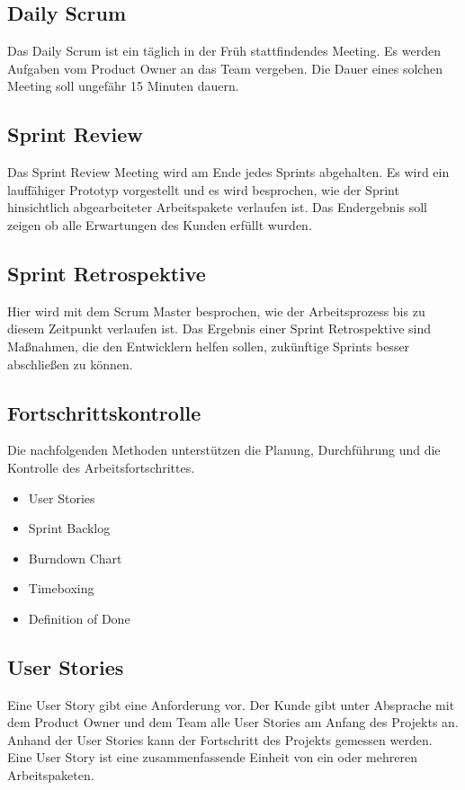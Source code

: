 		\subsection{Daily Scrum}
		Das Daily Scrum ist ein täglich in der Früh stattfindendes Meeting. Es werden Aufgaben vom Product Owner an das Team vergeben. Die Dauer eines solchen Meeting soll ungefähr 15 Minuten dauern.
		\subsection{Sprint Review}
		Das Sprint Review Meeting wird am Ende jedes Sprints abgehalten. Es wird ein lauffähiger Prototyp vorgestellt und es wird besprochen, wie der Sprint hinsichtlich abgearbeiteter Arbeitspakete verlaufen ist. Das Endergebnis soll zeigen ob alle Erwartungen des Kunden erfüllt wurden.
		\subsection{Sprint Retrospektive}
		Hier wird mit dem Scrum Master besprochen, wie der Arbeitsprozess bis zu diesem Zeitpunkt verlaufen ist. Das Ergebnis einer Sprint Retrospektive sind Maßnahmen, die den Entwicklern helfen sollen, zukünftige Sprints besser abschließen zu können.
		\subsection{Fortschrittskontrolle}
		Die nachfolgenden Methoden unterstützen die Planung, Durchführung und die Kontrolle des Arbeitsfortschrittes. 
		
		\begin{itemize}
			\item	User Stories
			\item	Sprint Backlog
			\item	Burndown Chart
			\item	Timeboxing
			\item	Definition of Done
		\end{itemize}
		
		\subsection{User Stories}
		Eine User Story gibt eine Anforderung vor. Der Kunde gibt unter Absprache mit dem Product Owner und dem Team alle User Stories am Anfang des Projekts an.
Anhand der User Stories kann der Fortschritt des Projekts gemessen werden.
Eine User Story ist eine zusammenfassende Einheit von ein oder mehreren Arbeitspaketen.

